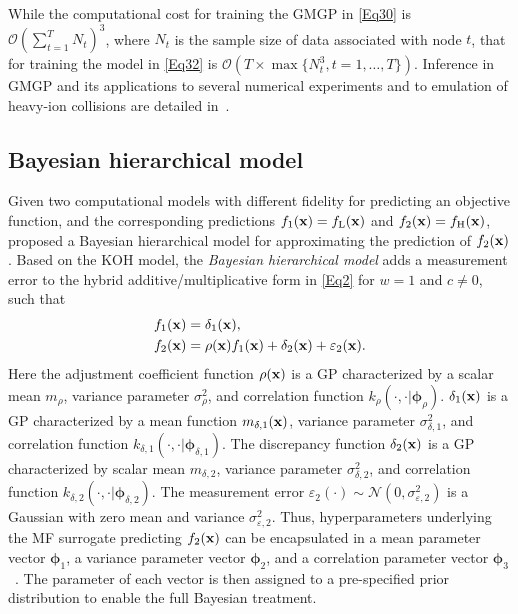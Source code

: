 \documentclass[iicol,sn-basic]{sn-jnl}%
\begin{document}
While the computational cost for training the GMGP in \cref{Eq30} is $\mathcal{O}(\sum_{t=1}^T N_t)^3$, where $N_t$ is the sample size of data associated with node $t$, that for training the model in \cref{Eq32} is $\mathcal{O}\left(T \times \max\{N_t^3,t=1,\dots,T\}\right)$.
Inference in GMGP and its applications to several numerical experiments and to emulation of heavy-ion collisions are detailed in~\cite{Ji2023}.

\subsection{Bayesian hierarchical model}\label{Sec44}

Given two computational models with different fidelity for predicting an objective function, and the corresponding predictions $f_1({\bf x})= f_\text{L}({\bf x})$ and $f_2({\bf x})= f_\text{H}({\bf x})$,
\cite{Qian2008} proposed a Bayesian hierarchical model for approximating the prediction of $f_\text{2}({\bf x})$.
Based on the KOH model, the \textit{Bayesian hierarchical model} adds a measurement error to the hybrid additive/multiplicative form in \cref{Eq2} for $w=1$ and $c \neq 0$, such that
\begin{subequations}\label{Eq15}
	\begin{align}
		f_1({\bf x}) & = \delta_1({\bf x}) \label{Eq15-1},\\
		f_\text{2}({\bf x}) & = \rho({\bf x})f_\text{1}({\bf x}) + \delta_2({\bf x})+\varepsilon_2({\bf x}) \label{Eq15-2}.
	\end{align}
\end{subequations}
Here the adjustment coefficient function $\rho({\bf x})$ is a GP characterized by a scalar mean $m_\rho$, variance parameter $\sigma^2_\rho$, and correlation function $k_\rho(\cdot,\cdot|{\boldsymbol \phi}_\rho)$.
$\delta_\text{1}({\bf x})$ is a GP characterized by a mean function $m_{\delta,1}({\bf x})$, variance parameter $\sigma^2_{\delta,1}$, and correlation function $k_{\delta,1}(\cdot,\cdot|{\boldsymbol \phi}_{\delta,1})$.
The discrepancy function $\delta_2({\bf x})$ is a GP characterized by scalar mean $m_{\delta,2}$, variance parameter $\sigma^2_{\delta,2}$, and correlation function $k_{\delta,2}(\cdot,\cdot|{\boldsymbol \phi}_{\delta,2})$.
The measurement error $\varepsilon_\text{2}(\cdot) \sim \mathcal{N}(0,\sigma^2_{\varepsilon,2})$ is a Gaussian with zero mean and variance $\sigma^2_{\varepsilon,2}$.
Thus, hyperparameters underlying the MF surrogate predicting $f_\text{2}({\bf x})$ can be encapsulated in a mean parameter vector ${\boldsymbol \phi}_1$, a variance parameter vector ${\boldsymbol \phi}_2$, and
a correlation parameter vector ${\boldsymbol \phi}_3$~\citep{Qian2008}. 
The parameter of each vector is then assigned to a pre-specified prior distribution to enable the full Bayesian treatment.
\end{document}
